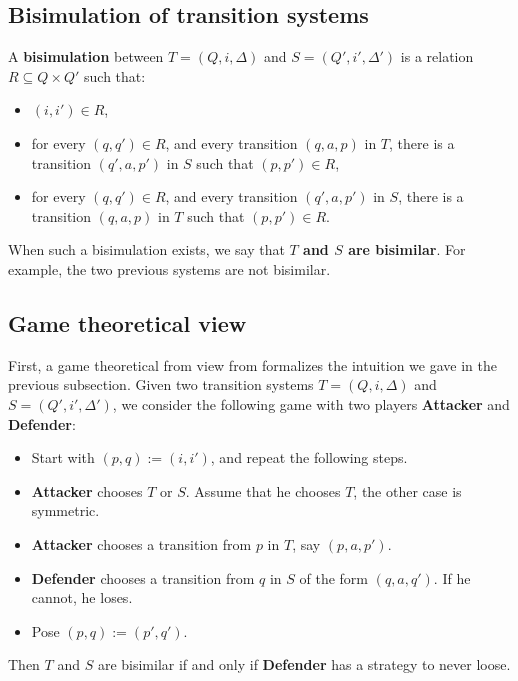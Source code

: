 	\subsection{Bisimulation of transition systems}
	\label{subsec:bire}




	A \textbf{bisimulation} \cite{park81} between $T = (Q,i,\Delta)$ and $S = (Q',i',\Delta')$ is a relation $R \subseteq Q\times Q'$ such that:
	\begin{itemize}
		\item $(i,i') \in R$,
		\item for every $(q,q') \in R$, and every transition $(q,a,p)$ in $T$, there is a transition $(q',a,p')$ in $S$ such that $(p,p') \in R$,
		\item for every $(q,q') \in R$, and every transition $(q',a,p')$ in $S$, there is a transition $(q,a,p)$ in $T$ such that $(p,p') \in R$.
	\end{itemize}
	When such a bisimulation exists, we say that \textbf{$T$ and $S$ are bisimilar}. For example, the two previous systems are not bisimilar.
	
	

	
		\subsection{Game theoretical view}
		
		 First, a game theoretical from view from \cite{stirling96} formalizes the intuition we gave in the previous subsection. Given two transition systems $T = (Q,i,\Delta)$ and $S = (Q',i',\Delta')$, we consider the following game with two players \textbf{Attacker} and \textbf{Defender}:
		 \begin{itemize}
		 	\item Start with $(p,q) := (i,i')$, and repeat the following steps.
			\item \textbf{Attacker} chooses $T$ or $S$. Assume that he chooses $T$, the other case is symmetric.
			\item \textbf{Attacker} chooses a transition from $p$ in $T$, say $(p,a,p')$.
			\item \textbf{Defender} chooses a transition from $q$ in $S$ of the form $(q,a,q')$. If he cannot, he loses.
			\item Pose $(p,q) := (p',q')$.
		\end{itemize}

Then $T$ and $S$ are bisimilar if and only if \textbf{Defender} has a strategy to never loose.
		 
